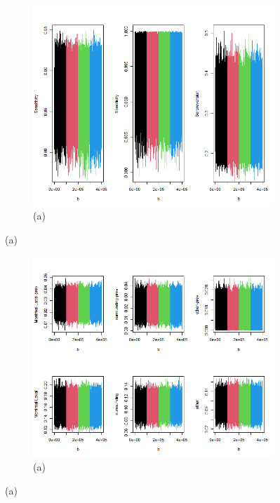 \captionsetup[subfigure]{labelformat=empty}
\begin{figure}[ht!]
\centering
\begin{subfigure}[b]{\columnwidth} 
    \includegraphics[width=\columnwidth]{../../plot/trace_global.png}
    \caption{(a)}
\end{subfigure}
\end{figure}

\captionsetup[subfigure]{labelformat=empty}
\begin{figure}[ht!]
\centering
\begin{subfigure}[b]{\columnwidth} 
    \includegraphics[width=\columnwidth]{../../plot/trace_regional.png}
    \caption{(a)}
\end{subfigure}
\end{figure}

